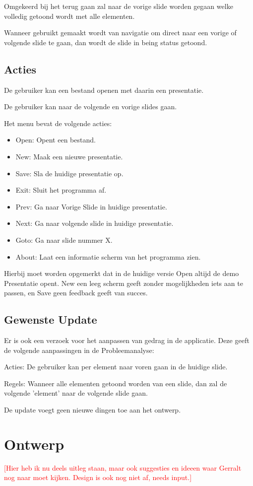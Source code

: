 \documentclass[a4paper]{article}
\newcommand{\todo}[1]{\textcolor{red}{[#1]}}
\begin{document}
Omgekeerd bij het terug gaan zal naar de vorige slide worden gegaan welke
volledig getoond wordt met alle elementen.

Wanneer gebruikt gemaakt wordt van navigatie om direct naar een vorige of
volgende slide te gaan, dan wordt de slide in being status getoond.

\subsection{Acties}
De gebruiker kan een bestand openen met daarin een presentatie.

De gebruiker kan naar de volgende en vorige slides gaan.

Het menu bevat de volgende acties:
\begin{itemize}
    \item Open: Opent een bestand.
    \item New: Maak een nieuwe presentatie.
    \item Save: Sla de huidige presentatie op.
    \item Exit: Sluit het programma af.
    \item Prev: Ga naar Vorige Slide in huidige presentatie.
    \item Next: Ga naar volgende slide in huidige presentatie.
    \item Goto: Ga naar slide nummer X.
    \item About: Laat een informatie scherm van het programma zien.
\end{itemize}
Hierbij moet worden opgemerkt dat in de huidige versie Open altijd de demo
Presentatie opent. New een leeg scherm geeft zonder mogelijkheden iets aan te
passen, en Save geen feedback geeft van succes.

\subsection{Gewenste Update}
Er is ook een verzoek voor het aanpassen van gedrag in de applicatie. Deze geeft
de volgende aanpassingen in de Probleemanalyse:

Acties: De gebruiker kan per element naar voren gaan in de huidige slide.

Regels: Wanneer alle elementen getoond worden van een slide, dan zal de volgende
'element' naar de volgende slide gaan.

De update voegt geen nieuwe dingen toe aan het ontwerp.

\section{Ontwerp}
\todo{Hier heb ik nu deels uitleg staan, maar ook suggesties en ideeen waar
Gerralt nog naar moet kijken. Design is ook nog niet af, needs input.}
\end{document}
